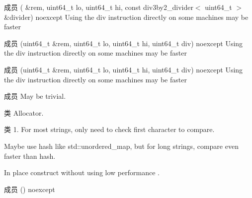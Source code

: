 \begin{DoxyRefList}
\item[成员 \doxylink{namespacewjr_a2ac368bf12ad574a2b044a57d4d7c64f}{wjr\+::div128by128to64} (\doxylink{classwjr_1_1uint128__t}{uint128\+\_\+t} \&rem, uint64\+\_\+t lo, uint64\+\_\+t hi, const div3by2\+\_\+divider$<$ uint64\+\_\+t $>$ \&divider) noexcept]\label{todo__todo000035}%
%
Using the {\ttfamily div} instruction directly on some machines may be faster  
\item[成员 \doxylink{namespacewjr_a122758d529da5743c56697211a29e473}{wjr\+::div128by64to128} (uint64\+\_\+t \&rem, uint64\+\_\+t lo, uint64\+\_\+t hi, uint64\+\_\+t div) noexcept]\label{todo__todo000034}%
%
Using the {\ttfamily div} instruction directly on some machines may be faster  
\item[成员 \doxylink{namespacewjr_a6b373ee33fd0a683a1ebbaebd3a1c63e}{wjr\+::div128by64to64} (uint64\+\_\+t \&rem, uint64\+\_\+t lo, uint64\+\_\+t hi, uint64\+\_\+t div) noexcept]\label{todo__todo000033}%
%
Using the {\ttfamily div} instruction directly on some machines may be faster  
\item[成员 \doxylink{structwjr_1_1get__relocate__mode_3_01small__vector__storage_3_01_t_00_01_capacity_00_01_alloc_01_4_01_4_aa677d71e831febe214c845f36f42a0f0}{wjr\+::get\+\_\+relocate\+\_\+mode\texorpdfstring{$<$}{<} small\+\_\+vector\+\_\+storage\texorpdfstring{$<$}{<} T, Capacity, Alloc \texorpdfstring{$>$}{>} \texorpdfstring{$>$}{>}\+::value} ]\label{todo__todo000022}%
%
May be trivial.  
\item[类 \doxylink{classwjr_1_1huffman__tree}{wjr\+::huffman\+\_\+tree\texorpdfstring{$<$}{<} T \texorpdfstring{$>$}{>}} ]\label{todo__todo000027}%
%
Allocator.  
\item[类 \doxylink{classwjr_1_1json_1_1basic__document}{wjr\+::json\+::basic\+\_\+document\texorpdfstring{$<$}{<} Traits \texorpdfstring{$>$}{>}} ]\label{todo__todo000029}%
%
1. For most strings, only need to check first character to compare.
\begin{DoxyEnumerate}
\item Maybe use hash like std\+::unordered\+\_\+map, but for long strings, compare even faster than hash.
\item In place construct without using low performance . 
\end{DoxyEnumerate}
\item[成员 \doxylink{classwjr_1_1json_1_1basic__document_a24a32eb670abc7bf12682a8572aee254}{wjr\+::json\+::basic\+\_\+document\texorpdfstring{$<$}{<} Traits \texorpdfstring{$>$}{>}\+::\texorpdfstring{$\sim$}{\string~}basic\+\_\+document} () noexcept]\label{todo__todo000030}%

\end{DoxyRefList}
